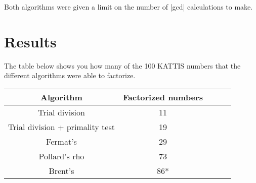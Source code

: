 \documentclass[paper=a4, fontsize=11pt,numbers=endperiod]{scrartcl} %
\numberwithin{equation}{section} %
\numberwithin{figure}{section} %
\numberwithin{table}{section} %
\begin{document}
Both algorithms were given a limit on the number of |gcd| calculations to make.




\section{Results}

The table below shows you how many of the 100 KATTIS numbers that the different algorithms were able to factorize.

    \begin{tabular}{|c|c|c|c|c|}
    \hline
    \textbf{Algorithm} & \textbf{Factorized numbers} \\ \hline
    Trial division & 11 \\ \hline
    Trial division + primality test & 19 \\ \hline
    Fermat's & 29 \\ \hline
    Pollard's rho & 73 \\ \hline
    Brent's & 86* \\ \hline
    \end{tabular}
    \hspace{10pt}
\end{document}
